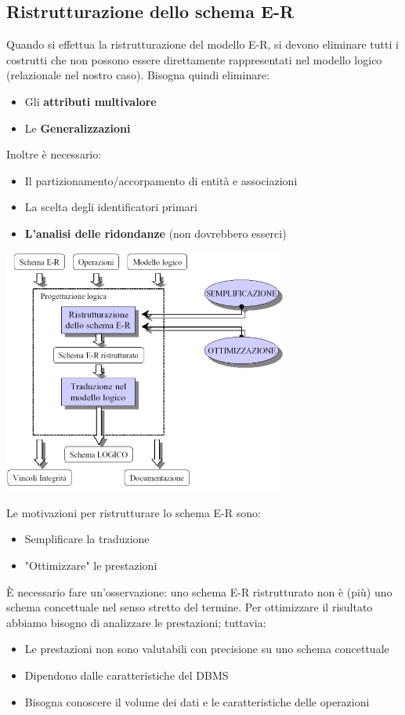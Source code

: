 \documentclass[12pt]{article}
\begin{document}
\subsection{Ristrutturazione dello schema E-R}
Quando si effettua la ristrutturazione del modello E-R, si devono eliminare tutti i costrutti che non possono essere direttamente rappresentati nel modello logico (relazionale nel nostro caso).
Bisogna quindi eliminare:
\begin{itemize}
    \item Gli \textbf{attributi multivalore}
    \item Le \textbf{Generalizzazioni}
\end{itemize}
Inoltre è necessario:
\begin{itemize}
    \item Il partizionamento/accorpamento di entità e associazioni
    \item La scelta degli identificatori primari
    \item \textbf{L'analisi delle ridondanze} (non dovrebbero esserci)
\end{itemize}
\begin{center}
    \includegraphics[width = 0.70\textwidth]{Images/89.PNG}
\end{center}
Le motivazioni per ristrutturare lo schema E-R sono:
\begin{itemize}
    \item Semplificare la traduzione
    \item "Ottimizzare" le prestazioni
\end{itemize}
È necessario fare un'osservazione: uno schema E-R ristrutturato non è (più) uno schema concettuale nel senso stretto del termine.
Per ottimizzare il risultato abbiamo bisogno di analizzare le prestazioni; tuttavia:
\begin{itemize}
    \item Le prestazioni non sono valutabili con precisione su uno schema concettuale
    \item Dipendono dalle caratteristiche del DBMS
    \item Bisogna conoscere il volume dei dati e le caratteristiche delle operazioni
\end{itemize}
\end{document}
